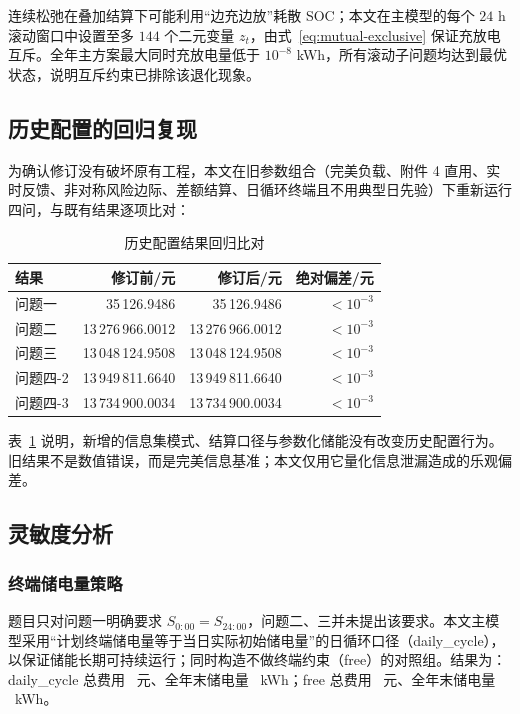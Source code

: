 连续松弛在叠加结算下可能利用“边充边放”耗散 SOC；本文在主模型的每个 $24$ h 滚动窗口中设置至多 $144$ 个二元变量 $z_t$，由式~\eqref{eq:mutual-exclusive} 保证充放电互斥。全年主方案最大同时充放电量低于 $10^{-8}$ kWh，所有滚动子问题均达到最优状态，说明互斥约束已排除该退化现象。

\subsection{历史配置的回归复现}

为确认修订没有破坏原有工程，本文在旧参数组合（完美负载、附件 4 直用、实时反馈、非对称风险边际、差额结算、日循环终端且不用典型日先验）下重新运行四问，与既有结果逐项比对：

\begin{table}[htbp]
	\caption{历史配置结果回归比对}
	\label{tab:regression}
	\centering
	\begin{tabular}{l r r r}
		\toprule
		结果 & 修订前/元 & 修订后/元 & 绝对偏差/元 \\
		\midrule
		问题一 & 35\,126.9486 & 35\,126.9486 & $<10^{-3}$ \\
		问题二 & 13\,276\,966.0012 & 13\,276\,966.0012 & $<10^{-3}$ \\
		问题三 & 13\,048\,124.9508 & 13\,048\,124.9508 & $<10^{-3}$ \\
		问题四-2 & 13\,949\,811.6640 & 13\,949\,811.6640 & $<10^{-3}$ \\
		问题四-3 & 13\,734\,900.0034 & 13\,734\,900.0034 & $<10^{-3}$ \\
		\bottomrule
	\end{tabular}
\end{table}

表~\ref{tab:regression} 说明，新增的信息集模式、结算口径与参数化储能没有改变历史配置行为。旧结果不是数值错误，而是完美信息基准；本文仅用它量化信息泄漏造成的乐观偏差。

\subsection{灵敏度分析}

\subsubsection{终端储电量策略}
\label{sec:terminal}

题目只对问题一明确要求 $S_{0{:}00}=S_{24{:}00}$，问题二、三并未提出该要求。本文主模型采用“计划终端储电量等于当日实际初始储电量”的日循环口径（daily\_cycle），以保证储能长期可持续运行；同时构造不做终端约束（free）的对照组。结果为：daily\_cycle 总费用 \SensTerminalCycle\ 元、全年末储电量 \SensTerminalCycleSoc\ kWh；free 总费用 \SensTerminalFree\ 元、全年末储电量 \SensTerminalFreeSoc\ kWh。

